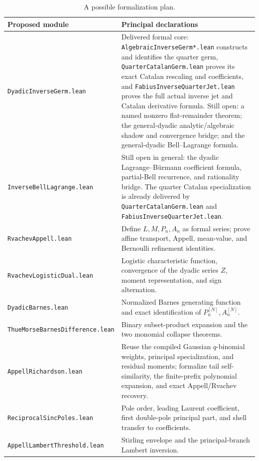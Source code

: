 \documentclass[11pt,oneside]{article}
\numberwithin{equation}{section}
\theoremstyle{definition}
\theoremstyle{remark}
\begin{document}
\begin{table}[htbp]
\centering
\small
\begin{tabularx}{\textwidth}{@{}>{\raggedright\arraybackslash}p{}X@{}}
\toprule
Proposed module & Principal declarations \\
\midrule
\texttt{DyadicInverseGerm.lean}
& Delivered formal core: \texttt{AlgebraicInverseGerm*.lean} constructs and identifies the quarter germ, \texttt{QuarterCatalanGerm.lean} proves its exact Catalan rescaling and coefficients, and \texttt{FabiusInverseQuarterJet.lean} proves the full actual inverse jet and Catalan derivative formula.  Still open: a named nonzero flat-remainder theorem; the general-dyadic analytic/algebraic shadow and convergence bridge; and the general-dyadic Bell--Lagrange formula. \\
\texttt{InverseBellLagrange.lean}
& Still open in general: the dyadic Lagrange--B\"urmann coefficient formula,
partial-Bell recurrence, and rationality bridge.  The quarter Catalan
specialization is already delivered by \texttt{QuarterCatalanGerm.lean} and
\texttt{FabiusInverseQuarterJet.lean}. \\
\texttt{RvachevAppell.lean}
& Define $L,M,P_n,A_n$ as formal series; prove affine transport, Appell, mean-value, and Bernoulli refinement identities. \\
\texttt{RvachevLogisticDual.lean}
& Logistic characteristic function, convergence of the dyadic series $Z$, moment representation, and sign alternation. \\
\texttt{DyadicBarnes.lean}
& Normalized Barnes generating function and exact identification of $P_n^{[N]},A_n^{[N]}$. \\
\texttt{ThueMorseBarnesDifference.lean}
& Binary subset-product expansion and the two monomial collapse theorems. \\
\texttt{AppellRichardson.lean}
& Reuse the compiled Gaussian $q$-binomial weights, principal specialization, and residual moments; formalize tail self-similarity, the finite-prefix polynomial expansion, and exact Appell/Rvachev recovery. \\
\texttt{ReciprocalSincPoles.lean}
& Pole order, leading Laurent coefficient, first double-pole principal part, and shell transfer to coefficients. \\
\texttt{AppellLambertThreshold.lean}
& Stirling envelope and the principal-branch Lambert inversion. \\
\bottomrule
\end{tabularx}
\caption{A possible formalization plan.}
\label{p2:tab:lean-roadmap}
\end{table}
\end{document}
